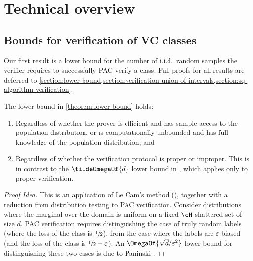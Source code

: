 \section{Technical overview}\label{section:technical-overview}

\subsection{Bounds for verification of VC classes}

Our first result is a lower bound for the number of i.i.d.\ random samples the verifier requires to successfully PAC verify a class. Full proofs for all results are deferred to \cref{section:lower-bound,section:verification-union-of-intervals,section:sq-algorithm-verification}.


\begin{remark}
	The lower bound in \cref{theorem:lower-bound} holds:
	\begin{enumerate}
		\item{
			Regardless of whether the prover is efficient and has sample access to the population distribution, or is computationally unbounded and has full knowledge of the population distribution; and
		}
		\item{
			Regardless of whether the verification protocol is proper or improper. This is in contrast to the $\tildeOmegaOf{d}$ lower bound in %
			\cite[Lemma 4.1]{GoldwasserRSY21}, %
			which applies only to proper verification.
		}
	\end{enumerate}
\end{remark}

\begin{proof}[Proof Idea]
	This is an application of Le Cam's method (), together with a reduction from distribution testing to PAC verification.  
	Consider distributions where the marginal over the domain is uniform on a fixed $\cH$-shattered set of size $d$.
	PAC verification requires distinguishing the case of truly random labels (where the loss of the class is $\sfrac{1}{2}$), from the case where the labels are $\varepsilon$-biased (and the loss of the class is $\sfrac{1}{2}-\varepsilon$). An $\OmegaOf{\sqrt{d}/\varepsilon^2}$ lower bound for distinguishing these two cases is due to Paninski \cite{DBLP:journals/tit/Paninski08}.
\end{proof}

